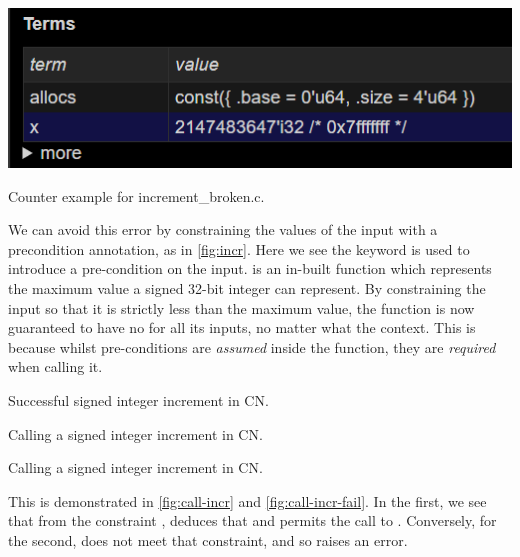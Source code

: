 \begin{marginfigure}
    \centering
    \includegraphics[width=\textwidth]{figures/increment_broken_state.png}
    \caption{Counter example for increment\_broken.c.}\label{fig:incr-broken-counter-ex}
\end{marginfigure}

We can avoid this error by constraining the values of the input with a
precondition annotation, as in \cref{fig:incr}. Here we see the keyword
 is used to introduce a pre-condition on the input.
 is an in-built function which represents the maximum value a
signed 32-bit integer can represent. By constraining the input so that it is
strictly less than the maximum value, the function is now guaranteed to have
no  for all its inputs, no matter what the context. This is because
whilst pre-conditions are \emph{assumed} inside the function, they are
\emph{required} when calling it.

\begin{marginfigure}
    \centering
    \caption{Successful signed integer increment in CN.}\label{fig:incr}
\end{marginfigure}

\begin{marginfigure}
    \ContinuedFloat*
    \centering
    \caption{Calling a signed integer increment in CN.}\label{fig:call-incr}
\end{marginfigure}

\begin{marginfigure}
    \ContinuedFloat{}
    \centering
    \caption{Calling a signed integer increment in CN.}\label{fig:call-incr-fail}
\end{marginfigure}

This is demonstrated in \cref{fig:call-incr} and \cref{fig:call-incr-fail}. In
the first, we see that from the constraint ,  deduces that  and permits the call to
. Conversely, for the second,  does not
meet that constraint, and so  raises an error.

